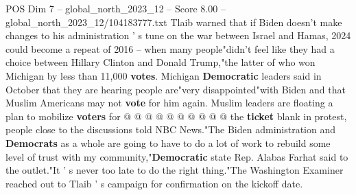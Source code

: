 \begin{textsample}{POS Dim 7 – global\_north\_2023\_12 – Score 8.00 – global\_north\_2023\_12/104183777.txt}
Tlaib warned that if Biden doesn't make changes to his administration ' s tune on the war between Israel and Hamas, 2024 could become a repeat of 2016 -- when many people"didn't feel like they had a choice between Hillary Clinton and Donald Trump,"the latter of who won Michigan by less than 11,000 \textbf{votes}.
Michigan \textbf{Democratic} leaders said in October that they are hearing people are"very disappointed"with Biden and that Muslim Americans may not \textbf{vote} for him again.
Muslim leaders are floating a plan to mobilize \textbf{voters} for @ @ @ @ @ @ @ @ @ @ the \textbf{ticket} blank in protest, people close to the discussions told NBC News."The Biden administration and \textbf{Democrats} as a whole are going to have to do a lot of work to rebuild some level of trust with my community,"\textbf{Democratic} state Rep.
Alabas Farhat said to the outlet."It ' s never too late to do the right thing."The Washington Examiner reached out to Tlaib ' s campaign for confirmation on the kickoff date.

\end{textsample}
